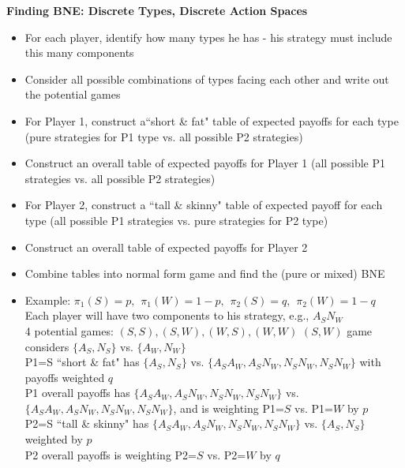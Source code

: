 \documentclass{report}
\newcommand{\FlowerSmall}{\mbox{\raisebox{-1pt}{\small\EightFlowerPetalRemoved}}} %
\begin{document}
\bigskip
\begin{mdframed}
	\medskip
	\begin{center} \textbf{{\large Finding BNE: Discrete Types, Discrete Action Spaces}} \end{center}
	\begin{itemize}[label=\FlowerSmall]
		\item For each player, identify how many types he has - his strategy must include this many components
		\item Consider all possible combinations of types facing each other and write out the potential games
		\item For Player 1, construct a``short \& fat" table of expected payoffs for each type (pure strategies for P1 type vs. all possible P2 strategies)
		\item Construct an overall table of expected payoffs for Player 1 (all possible P1 strategies vs. all possible P2 strategies)
		\item For Player 2, construct a ``tall \& skinny" table of expected payoff for each type (all possible P1 strategies vs. pure strategies for P2 type)
		\item Construct an overall table of expected payoffs for Player 2
		\item Combine tables into normal form game and find the (pure or mixed) BNE
		\item Example: $\pi_1(S) = p, \hspace{5pt} \pi_1(W) = 1-p, \hspace{5pt} \pi_2(S) = q, \hspace{5pt} \pi_2(W) = 1-q$\\[5pt]
		Each player will have two components to his strategy, e.g., $A_S N_W$\\[5pt]
		4 potential games: $(S,S), (S,W), (W,S), (W,W)$ \hspace{10pt} $(S,W)$ game considers $\{A_S, N_S\}$ vs. $\{A_W, N_W\}$ \\[15pt]
		P1=S ``short \& fat" has $\{A_S, N_S \}$ vs. $\{A_S A_W, A_S N_W, N_S N_W, N_S N_W\}$ with payoffs weighted $q$\\[5pt]
		P1 overall payoffs has $\{A_S A_W, A_S N_W, N_S N_W, N_S N_W\}$ vs. $\{A_S A_W, A_S N_W, N_S N_W, N_S N_W\}$, and is weighting P1=$S$ vs. P1=$W$ by $p$\\[15pt]
		P2=S ``tall \& skinny" has $\{A_S A_W, A_S N_W, N_S N_W, N_S N_W\}$ vs. $\{A_S, N_S \}$ weighted by $p$\\[5pt]
		P2 overall payoffs is weighting P2=$S$ vs. P2=$W$ by $q$
	\end{itemize}
	\smallskip
\end{mdframed}
\bigskip
\end{document}
